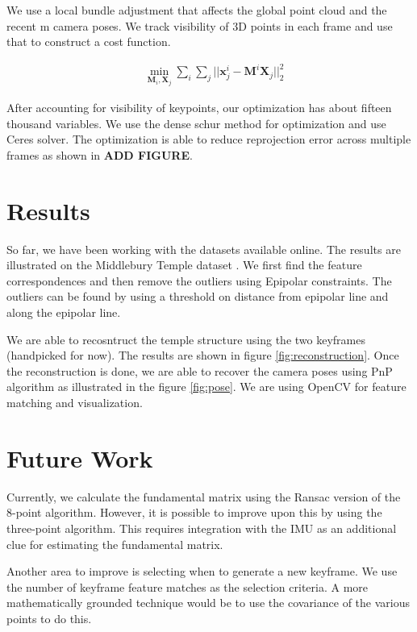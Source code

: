 \documentclass{article}
\begin{document}
We use a local bundle adjustment that affects the global point cloud and the recent m camera poses. We track visibility of 3D points in each frame and use that to construct a cost function.

\begin{align*}
    &\min_{\textbf{M}_i, \textbf{X}_j} \sum_i \sum_j || \textbf{x}^{i}_{j} - \textbf{M}^{i} \textbf{X}_j||^{2}_{2}
\end{align*}

After accounting for visibility of keypoints, our optimization has about fifteen thousand variables. We use the dense schur method for optimization and use Ceres solver\cite{ceres-solver}. The optimization is able to reduce reprojection error across multiple frames as shown in \textbf{ADD FIGURE}.

\section{Results}
So far, we have been working with the datasets available online. The results are illustrated on the Middlebury Temple dataset \cite{middlebury}. We first find the feature correspondences and then remove the outliers using Epipolar constraints. The outliers can be found by using a threshold on distance from epipolar line and along the epipolar line.

We are able to recosntruct the temple structure using the two keyframes (handpicked for now). The results are shown in figure \ref{fig:reconstruction}. Once the reconstruction is done, we are able to recover the camera poses using PnP algorithm as illustrated in the figure \ref{fig:pose}. We are using OpenCV for feature matching and visualization.


\section{Future Work}

Currently, we calculate the fundamental matrix using the Ransac version of the 8-point algorithm. However, it is possible to improve upon this by using the three-point algorithm. This requires integration with the IMU as an additional clue for estimating the fundamental matrix.

Another area to improve is selecting when to generate a new keyframe. We use the number of keyframe feature matches as the selection criteria. A more mathematically grounded technique would be to use the covariance of the various points to do this.
\end{document}

